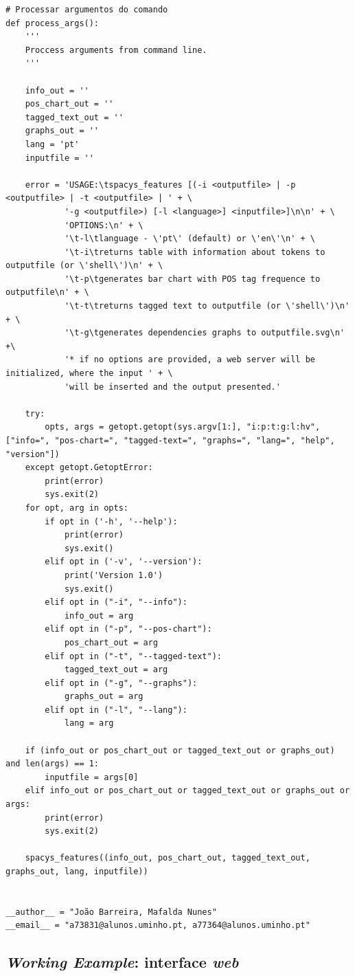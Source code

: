 \documentclass[12pt]{article}
\begin{document}
\begin{verbatim}
# Processar argumentos do comando
def process_args():
    '''
    Proccess arguments from command line.
    '''

    info_out = ''
    pos_chart_out = ''
    tagged_text_out = ''
    graphs_out = ''
    lang = 'pt'
    inputfile = ''

    error = 'USAGE:\tspacys_features [(-i <outputfile> | -p <outputfile> | -t <outputfile> | ' + \
            '-g <outputfile>) [-l <language>] <inputfile>]\n\n' + \
            'OPTIONS:\n' + \
            '\t-l\tlanguage - \'pt\' (default) or \'en\'\n' + \
            '\t-i\treturns table with information about tokens to outputfile (or \'shell\')\n' + \
            '\t-p\tgenerates bar chart with POS tag frequence to outputfile\n' + \
            '\t-t\treturns tagged text to outputfile (or \'shell\')\n' + \
            '\t-g\tgenerates dependencies graphs to outputfile.svg\n' +\
            '* if no options are provided, a web server will be initialized, where the input ' + \
            'will be inserted and the output presented.'

    try:
        opts, args = getopt.getopt(sys.argv[1:], "i:p:t:g:l:hv", ["info=", "pos-chart=", "tagged-text=", "graphs=", "lang=", "help", "version"])
    except getopt.GetoptError:
        print(error)
        sys.exit(2)
    for opt, arg in opts:
        if opt in ('-h', '--help'):
            print(error)
            sys.exit()
        elif opt in ('-v', '--version'):
            print('Version 1.0')
            sys.exit()
        elif opt in ("-i", "--info"):
            info_out = arg
        elif opt in ("-p", "--pos-chart"):
            pos_chart_out = arg
        elif opt in ("-t", "--tagged-text"):
            tagged_text_out = arg
        elif opt in ("-g", "--graphs"):
            graphs_out = arg
        elif opt in ("-l", "--lang"):
            lang = arg

    if (info_out or pos_chart_out or tagged_text_out or graphs_out) and len(args) == 1:
        inputfile = args[0]
    elif info_out or pos_chart_out or tagged_text_out or graphs_out or args:
        print(error)
        sys.exit(2)

    spacys_features((info_out, pos_chart_out, tagged_text_out, graphs_out, lang, inputfile))


__author__ = "João Barreira, Mafalda Nunes"
__email__ = "a73831@alunos.uminho.pt, a77364@alunos.uminho.pt"
\end{verbatim}

\newpage

\subsection{\textit{Working Example}: interface \textit{web}}
\label{anexo:working_example_web}
\end{document}
